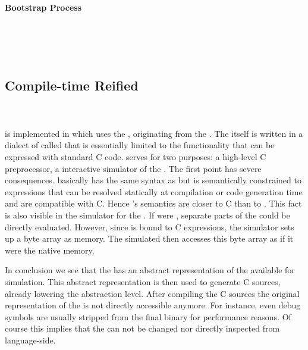 \paragraph{Bootstrap Process}
\\
 \\
 \\


\subsection{Compile-time Reified \VMs}
\subsubsection*{\Squeak \ST \VM}
 \\

\WF is implemented in \PH which uses the , originating from the \Squeak \VM\cite{Inga97a}.
The \VM itself is written in a dialect of \ST called \Slang that is essentially limited to the functionality that can be expressed with standard C code.
\Slang serves for two purposes: a high-level C preprocessor, a interactive simulator of the \VM.
The first point has severe consequences.
\Slang basically has the same syntax as \ST but is semantically constrained to expressions that can be resolved statically at compilation or code generation time and are compatible with C.
Hence \Slang's semantics are closer to C than to \ST.
This fact is also visible in the simulator for the \VM.
If \Slang were \ST, separate parts of the \VM could be directly evaluated.
However, since \Slang is bound to C expressions, the simulator sets up a byte array as memory.
The simulated \VM then accesses this byte array as if it were the native memory.

In conclusion we see that the \PH \VM has an abstract representation of the \VM available for simulation.
This abstract representation is then used to generate C sources, already lowering the abstraction level.
After compiling the C sources the original representation of the \VM is not directly accessible anymore.
For instance, even debug symbols are usually stripped from the final binary for performance reasons.
Of course this implies that the \VM can not be changed nor directly inspected from language-side.


